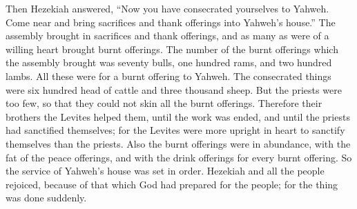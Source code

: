 {\par }{\PP {}Then Hezekiah answered, “Now you have consecrated yourselves to Yahweh. Come near and bring sacrifices and thank offerings into Yahweh’s house.” The assembly brought in sacrifices and thank offerings, and as many as were of a willing heart brought burnt offerings.
The number of the burnt offerings which the assembly brought was seventy bulls, one hundred rams, and two hundred lambs. All these were for a burnt offering to Yahweh.
The consecrated things were six hundred head of cattle and three thousand sheep.
But the priests were too few, so that they could not skin all the burnt offerings. Therefore their brothers the Levites helped them, until the work was ended, and until the priests had sanctified themselves; for the Levites were more upright in heart to sanctify themselves than the priests.
Also the burnt offerings were in abundance, with the fat of the peace offerings, and with the drink offerings for every burnt offering. So the service of Yahweh’s house was set in order.
Hezekiah and all the people rejoiced, because of that which God had prepared for the people; for the thing was done suddenly.

}
